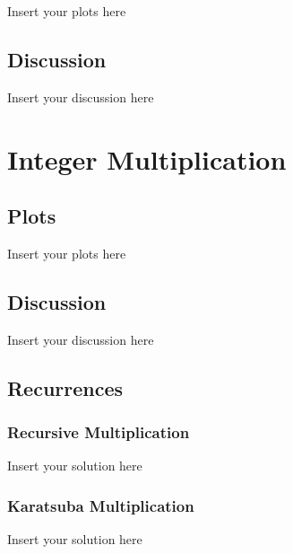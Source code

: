 \documentclass[a4paper]{article}
\begin{document}
Insert your plots here

\subsection{Discussion}

Insert your discussion here

\section{Integer Multiplication}

\subsection{Plots}

\noindent Insert your plots here

\subsection{Discussion}

\noindent Insert your discussion here

\subsection{Recurrences}

\subsubsection{Recursive Multiplication}

\noindent Insert your solution here

\subsubsection{Karatsuba Multiplication}

\noindent Insert your solution here
\end{document}
